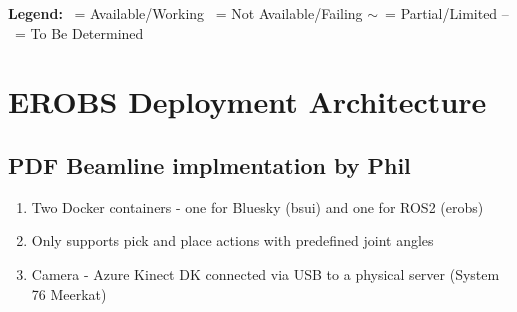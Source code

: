 \documentclass[12pt, a4paper]{article}
\newcommand{\yes}{\textcolor{green!60!black}{\ding{51}}}
\newcommand{\no}{\textcolor{red!70!black}{\ding{55}}}
\newcommand{\maybe}{\textcolor{orange!80!black}{$\sim$}}
\newcommand{\tbd}{--}
\begin{document}
\noindent
\textbf{Legend:} \yes\ = Available/Working \quad \no\ = Not Available/Failing \quad \maybe\ = Partial/Limited \quad \tbd\ = To Be Determined

\section{EROBS Deployment Architecture}
\subsection{PDF Beamline implmentation by Phil}
\begin{enumerate}
    \item Two Docker containers - one for Bluesky (bsui) and one for ROS2 (erobs)
    \item Only supports pick and place actions with predefined joint angles
    \item Camera - Azure Kinect DK connected via USB to a physical server (System 76 Meerkat)
\end{enumerate}
\end{document}
